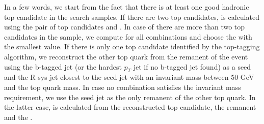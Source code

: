 In a few words, we start from the fact that there is at least one good hadronic top candidate in the search samples. 
If there are two top candidates, \MTTwo is calculated using the pair of top 
candidates and \MET. In case of there are more than two top candidates
in the sample, we compute \MTTwo for all combinations and choose the 
\MTTwo with the smallest value. If there is only one top candidate identified
by the top-tagging algorithm, we reconstruct the other top 
quark from the remanent of the event using the b-tagged jet (or the hardest $p_{T}$ jet if no b-tagged jet found) as a seed and the R-sys 
jet closest to the seed jet with an invariant mass between 50 GeV and 
the top quark mass. In case no combination satisfies the invariant mass
requirement, we use the seed jet as the only remanent of the other 
top quark. In the latter case, \MTTwo is calculated from the reconstructed top candidate, the remanent and the \MET.


